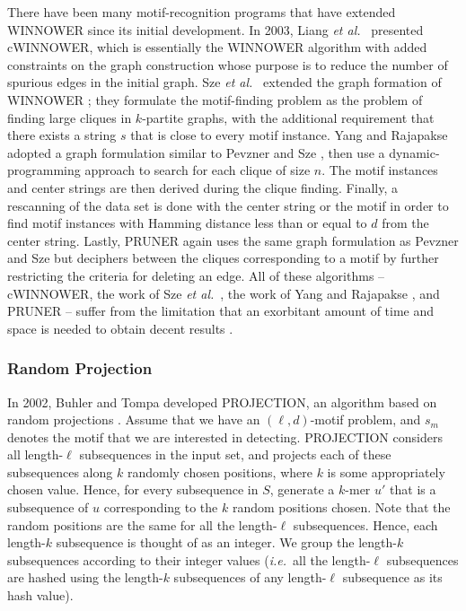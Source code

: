 There have been many motif-recognition programs that have extended WINNOWER since its initial development.  In 2003, Liang {\em et al.}\ \cite{LSB04} presented cWINNOWER, which is essentially the WINNOWER algorithm with added constraints on the graph construction whose purpose is to reduce the number of spurious edges in the initial graph. Sze {\em et al.}\ \cite{SLC04} extended the graph formation of WINNOWER \cite{PS00}; they formulate the motif-finding problem as the problem of finding large cliques in $k$-partite graphs, with the additional requirement that there exists a string $s$ that is close to every motif instance.  Yang and Rajapakse \cite{YR04} adopted a graph formulation similar to Pevzner and Sze \cite{PS00}, then use a dynamic-programming approach to search for each clique of size $n$. The motif instances and center strings are then derived during the clique finding. Finally, a rescanning of the data set is done with the center string or the motif in order to find motif instances with Hamming distance less than or equal to $d$ from the center string. Lastly, PRUNER \cite{pruner} again uses the same graph formulation as Pevzner and Sze \cite{PS00} but deciphers between the cliques corresponding to a motif by further restricting the criteria for deleting an edge.  All of these algorithms -- cWINNOWER, the work of Sze {\em et al.}\ \cite{SLC04}, the work of Yang and Rajapakse \cite{YR04}, and PRUNER --  suffer from the limitation that an exorbitant amount of  time and space is needed to obtain decent results \cite{LSB04,pruner,SLC04,YR04}.

\subsubsection{Random Projection}

In 2002, Buhler and Tompa developed PROJECTION, an algorithm based on random projections \cite{BT02}.  Assume that we have an $(\ell, d)$-motif problem, and $s_m$ denotes the motif that we are interested in detecting.  PROJECTION considers all length-$\ell$ subsequences in the input set, and projects each of these subsequences along $k$ randomly chosen positions, where $k$ is some appropriately chosen value.  Hence, for every subsequence in $S$, generate a $k$-mer $u'$ that is a subsequence of $u$ corresponding to the $k$ random positions chosen.  Note that the random positions are the same for all the length-$\ell$ subsequences.  Hence, each length-$k$ subsequence is thought of as an integer.  We group the length-$k$ subsequences according to their integer values ({\em i.e.}\ all the length-$\ell$ subsequences are hashed using the length-$k$ subsequences of any length-$\ell$ subsequence as its hash value).  

